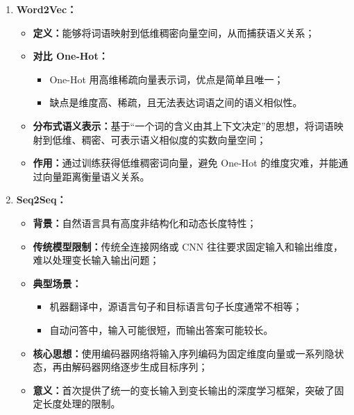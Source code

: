 \documentclass[../main.tex]{subfiles}
\begin{document}
\begin{enumerate}
    \item \textbf{Word2Vec：}
    \begin{itemize}
        \item \textbf{定义：}能够将词语映射到低维稠密向量空间，从而捕获语义关系；
        \item \textbf{对比 One-Hot：}
        \begin{itemize}
            \item One-Hot 用高维稀疏向量表示词，优点是简单且唯一；
            \item 缺点是维度高、稀疏，且无法表达词语之间的语义相似性。
        \end{itemize}
        \item \textbf{分布式语义表示：}基于“一个词的含义由其上下文决定”的思想，将词语映射到低维、稠密、可表示语义相似度的实数向量空间；
        \item \textbf{作用：}通过训练获得低维稠密词向量，避免 One-Hot 的维度灾难，并能通过向量距离衡量语义关系。
    \end{itemize}

    \item \textbf{Seq2Seq：}
    \begin{itemize}
        \item \textbf{背景：}自然语言具有高度非结构化和动态长度特性；
        \item \textbf{传统模型限制：}传统全连接网络或 CNN 往往要求固定输入和输出维度，难以处理变长输入输出问题；
        \item \textbf{典型场景：}
        \begin{itemize}
            \item 机器翻译中，源语言句子和目标语言句子长度通常不相等；
            \item 自动问答中，输入可能很短，而输出答案可能较长。
        \end{itemize}
        \item \textbf{核心思想：}使用编码器网络将输入序列编码为固定维度向量或一系列隐状态，再由解码器网络逐步生成目标序列；
        \item \textbf{意义：}首次提供了统一的变长输入到变长输出的深度学习框架，突破了固定长度处理的限制。
    \end{itemize}
\end{enumerate}
\end{document}
